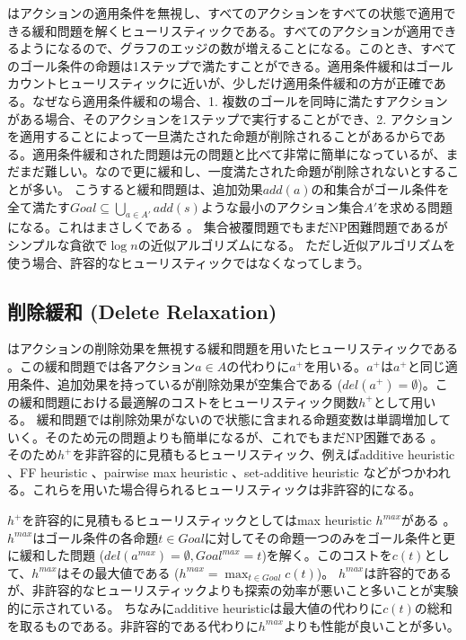 はアクションの適用条件を無視し、すべてのアクションをすべての状態で適用できる緩和問題を解くヒューリスティックである。すべてのアクションが適用できるようになるので、グラフのエッジの数が増えることになる。このとき、すべてのゴール条件の命題は1ステップで満たすことができる。適用条件緩和はゴールカウントヒューリスティックに近いが、少しだけ適用条件緩和の方が正確である。なぜなら適用条件緩和の場合、1. 複数のゴールを同時に満たすアクションがある場合、そのアクションを1ステップで実行することができ、2. アクションを適用することによって一旦満たされた命題が削除されることがあるからである。適用条件緩和された問題は元の問題と比べて非常に簡単になっているが、まだまだ難しい。なので更に緩和し、一度満たされた命題が削除されないとすることが多い。
こうすると緩和問題は、追加効果$add(a)$の和集合がゴール条件を全て満たす$Goal \subseteq \bigcup_{a \in A'} add(s)$ような最小のアクション集合$A'$を求める問題になる。これはまさしくである \cite{karp1972reducibility}。
集合被覆問題でもまだNP困難問題であるがシンプルな貪欲で$\log n$の近似アルゴリズムになる\cite{chvatal1979greedy}。
ただし近似アルゴリズムを使う場合、許容的なヒューリスティックではなくなってしまう。


\subsection{削除緩和 (Delete Relaxation)}

はアクションの削除効果を無視する緩和問題を用いたヒューリスティックである \cite{hoffmann:01a}。この緩和問題では各アクション$a \in A$の代わりに$a^+$を用いる。$a^+$は$a^+$と同じ適用条件、追加効果を持っているが削除効果が空集合である ($del(a^+) = \emptyset$)。この緩和問題における最適解のコストをヒューリスティック関数$h^+$として用いる。
緩和問題では削除効果がないので状態に含まれる命題変数は単調増加していく。そのため元の問題よりも簡単になるが、これでもまだNP困難である \cite{bylander:94}。
そのため$h^+$を非許容的に見積もるヒューリスティック、例えばadditive heuristic \cite{bonet:01a}、FF heuristic \cite{hoffmann:01a}、pairwise max heuristic \cite{mirkis2007cost}、set-additive heuristic \cite{keyder2009trees}などがつかわれる。これらを用いた場合得られるヒューリスティックは非許容的になる。

$h^+$を許容的に見積もるヒューリスティックとしてはmax heuristic $h^{max}$がある \cite{bonet:01a}。$h^{max}$はゴール条件の各命題$t \in Goal$に対してその命題一つのみをゴール条件と更に緩和した問題 ($del(a^{max}) = \emptyset, Goal^{max} = t$)を解く。このコストを$c(t)$として、$h^{max}$はその最大値である ($h^{max} = \max_{t \in Goal} c(t)$)。
$h^{max}$は許容的であるが、非許容的なヒューリスティックよりも探索の効率が悪いこと多いことが実験的に示されている。
ちなみにadditive heuristicは最大値の代わりに$c(t)$の総和を取るものである。非許容的である代わりに$h^{max}$よりも性能が良いことが多い。

